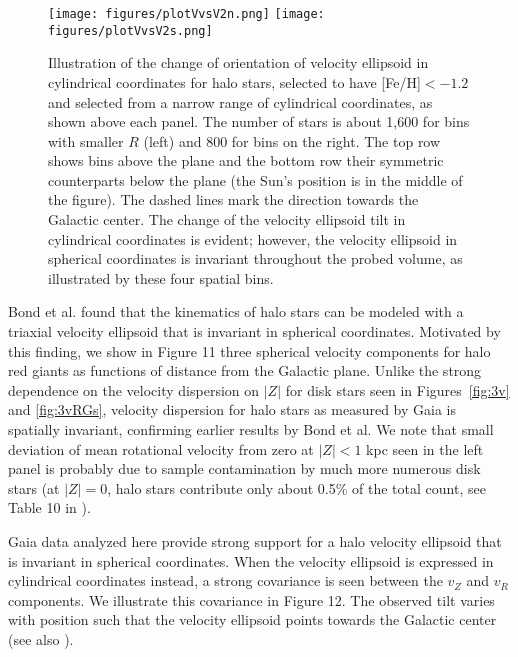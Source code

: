 \begin{figure}[!ht]
\texttt{[image: figures/plotVvsV2n.png]}
\vskip -2in   
\texttt{[image: figures/plotVvsV2s.png]}
\vskip -2in   
\caption{Illustration of the change of orientation of velocity ellipsoid in cylindrical coordinates for halo stars,
  selected to have [Fe/H]$<-1.2$ and selected from a narrow range of cylindrical coordinates, as shown above
  each panel. The number of stars is about 1,600 for bins with smaller $R$ (left) and 800 for bins on the right.
  The top row shows bins above the plane and the bottom row their symmetric counterparts below the plane
  (the Sun's position is in the middle of the figure). 
  The dashed lines mark the direction towards the Galactic center. The change of the velocity ellipsoid tilt
  in cylindrical coordinates is evident; however, the velocity ellipsoid in spherical coordinates is invariant
  throughout the probed volume, as illustrated by these four spatial bins.} 
\label{fig:haloTilt} 
\end{figure}



Bond et al. found that the kinematics of halo stars can be modeled with a triaxial velocity ellipsoid that is invariant in
spherical coordinates. Motivated by this finding, we show in
Figure 11 
three spherical velocity components for halo red giants as functions of distance from the Galactic plane. Unlike the strong dependence on the velocity dispersion
on $|Z|$ for disk stars seen in Figures~\ref{fig:3v} and \ref{fig:3vRGs}, velocity dispersion for halo stars as measured by
Gaia is spatially invariant, confirming earlier results by Bond et al. We note that small deviation of mean rotational
velocity from zero at $|Z|<1$ kpc seen in the left panel is probably due to sample contamination by much more numerous
disk stars (at $|Z|=0$, halo stars contribute only about 0.5\% of the total count, see Table 10 in \citealt{2008ApJ...673..864J}).  

Gaia data analyzed here provide strong support for a halo velocity ellipsoid that is invariant in spherical coordinates.
When the velocity ellipsoid is expressed in cylindrical coordinates instead, a strong covariance is seen between the $v_Z$ and $v_R$
components. We illustrate this covariance in
Figure 12. 
The observed tilt varies with position such that the
velocity ellipsoid points towards the Galactic center (see also \citealt{2019MNRAS.489..910E}). 
 